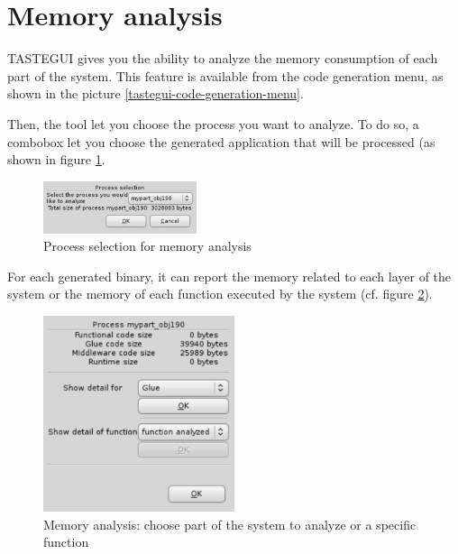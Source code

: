 \documentclass[11pt]{book}
\begin{document}
   \section{Memory analysis}
   TASTEGUI gives you the ability to analyze the memory consumption of each part
   of the system. This feature is available from the code generation menu, as
   shown in the picture \ref{tastegui-code-generation-menu}. 

   Then, the tool let you choose the process you want to analyze. To do so, a
   combobox let you choose the generated application that will be processed (as
   shown in figure \ref{tastegui-mem-analysis-choose-process}.

\begin{figure}[!h]
\centering
\includegraphics[width=0.4\textwidth]{imgs/memory-analysis2}
\caption{Process selection for memory analysis}
\label{tastegui-mem-analysis-choose-process}
\end{figure}


   
   For each generated binary, it can report the memory related to
   each layer of the system or the memory of each function executed by the
   system (cf. figure \ref{tastegui-mem-analysis-part-funcs}).

\begin{figure}[!h]
\centering
\includegraphics[width=0.5\textwidth]{imgs/memory-analysis3}
\caption{Memory analysis: choose part of the system to analyze or a specific function}
\label{tastegui-mem-analysis-part-funcs}
\end{figure}
\end{document}
